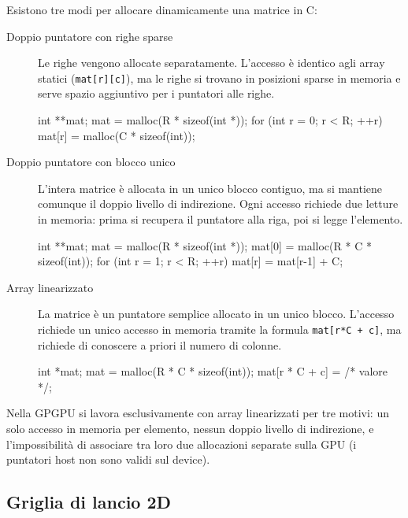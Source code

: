 \noindent
Esistono tre modi per allocare dinamicamente una matrice in C:

\begin{description}
    \item[Doppio puntatore con righe sparse] Le righe vengono allocate separatamente. L'accesso è identico agli array statici (\texttt{mat[r][c]}), ma le righe si trovano in posizioni sparse in memoria e serve spazio aggiuntivo per i puntatori alle righe.

\begin{code}[caption={Matrice con righe sparse}, label={code:matinit_alloc1}]
int **mat;
mat = malloc(R * sizeof(int *));
for (int r = 0; r < R; ++r)
    mat[r] = malloc(C * sizeof(int));
\end{code}

    \item[Doppio puntatore con blocco unico] L'intera matrice è allocata in un unico blocco contiguo, ma si mantiene comunque il doppio livello di indirezione. Ogni accesso richiede due letture in memoria: prima si recupera il puntatore alla riga, poi si legge l'elemento.

\begin{code}[caption={Matrice in blocco unico con doppio puntatore}, label={code:matinit_alloc2}]
int **mat;
mat = malloc(R * sizeof(int *));
mat[0] = malloc(R * C * sizeof(int));
for (int r = 1; r < R; ++r)
    mat[r] = mat[r-1] + C;
\end{code}

    \item[Array linearizzato] La matrice è un puntatore semplice allocato in un unico blocco. L'accesso richiede un unico accesso in memoria tramite la formula \texttt{mat[r*C + c]}, ma richiede di conoscere a priori il numero di colonne.

\begin{code}[caption={Matrice linearizzata}, label={code:matinit_alloc3}]
int *mat;
mat = malloc(R * C * sizeof(int));
mat[r * C + c] = /* valore */;
\end{code}

\end{description}

Nella GPGPU si lavora esclusivamente con array linearizzati per tre motivi: un solo accesso in memoria per elemento, nessun doppio livello di indirezione, e l'impossibilità di associare tra loro due allocazioni separate sulla GPU (i puntatori host non sono validi sul device).

\subsection{Griglia di lancio 2D}

